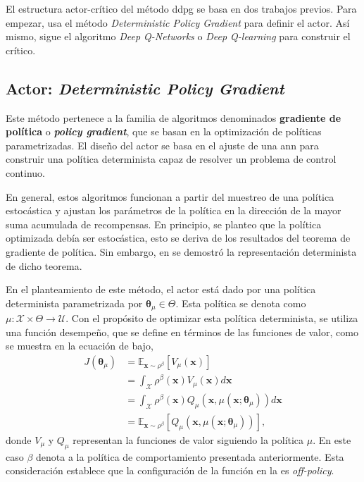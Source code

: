 El estructura actor-crítico del método \acrshort{ddpg}
se basa en dos trabajos previos. Para empezar, usa el método \textit{Deterministic Policy Gradient} \cite{silver14} para definir el actor. Así mismo, sigue el algoritmo \textit{Deep Q-Networks} o \textit{Deep Q-learning} \cite{mnih2013} para construir el crítico. 

\subsection{Actor: \textit{Deterministic Policy Gradient}}
\label{subsec:actor}
Este método pertenece a la familia de algoritmos denominados \textbf{gradiente de política} o \textbf{\textit{policy gradient}}, que se basan en la optimización de políticas parametrizadas. El diseño del actor se basa en el ajuste de una \acrshort{ann} para construir una política determinista capaz de resolver un problema de control continuo. 

En general, estos algoritmos funcionan a partir del muestreo de una política estocástica y ajustan los parámetros de la política en la dirección de la mayor suma acumulada de recompensas. En principio, se planteo que la política optimizada debía ser estocástica, esto se deriva de los resultados del teorema de gradiente de política. Sin embargo, en \cite{silver14} se demostró la representación determinista de dicho teorema. 

En el planteamiento de este método, el actor está dado por una política determinista parametrizada por $\bm\theta_{\mu} \in \Theta$. Esta política se denota como $\mu: \mathcal{X}\times\Theta\rightarrow \mathcal{U}$. Con el propósito de optimizar esta política determinista, se utiliza una función desempeño, que se define en términos de las funciones de valor, como se muestra en la ecuación de bajo,
\begin{equation}
    \begin{aligned}
    J(\bm\theta_{\mu}) &= \mathbb{E}_{\mathbf{x}\sim\rho^{\beta}}\left[V_{\mu}(\mathbf{x})\right] \\
    &= \int_{\mathcal{X}}\rho^{\beta}(\mathbf{x})V_{\mu}(\mathbf{x})d\mathbf{x}\\
    &= \int_{\mathcal{X}}\rho^{\beta}(\mathbf{x})Q_{\mu}(\mathbf{x}, \mu(\mathbf{x};\bm\theta_{\mu}))d\mathbf{x} \\
    &= \mathbb{E}_{\mathbf{x}\sim\rho^{\beta}}\left[
    Q_{\mu}(\mathbf{x}, \mu(\mathbf{x}; \bm\theta_{\mu}))\right],
    \end{aligned}
    \label{eq:dpg_objective}
\end{equation}
donde $V_{\mu}$ y $Q_{\mu}$ representan la funciones de valor siguiendo la política $\mu$.
En este caso $\beta$ denota a la política de comportamiento presentada anteriormente. Esta consideración establece que la configuración de la función en la  es \textit{off-policy}. 

